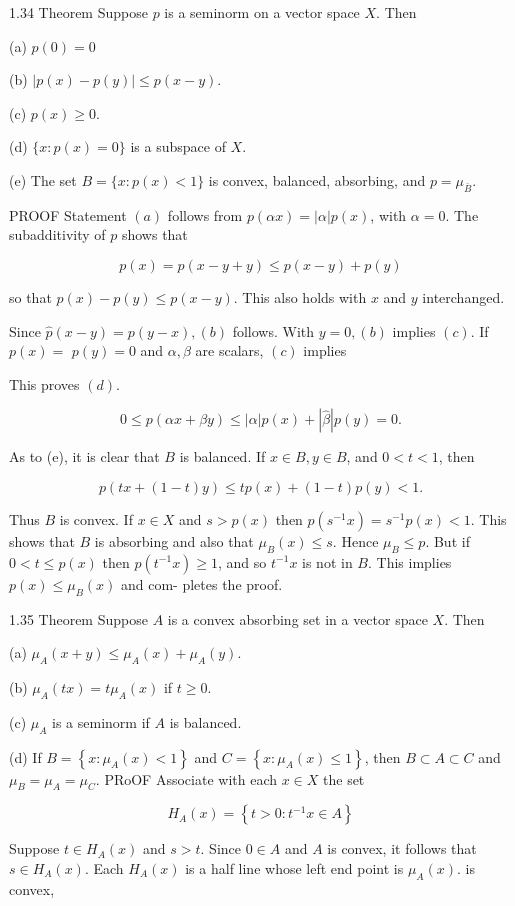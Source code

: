 \documentclass[10pt]{article}
\begin{document}
1.34 Theorem Suppose $p$ is a seminorm on a vector space $X$. Then

(a) $p(0)=0$

(b) $|p(x)-p(y)| \leq p(x-y)$.

(c) $p(x) \geq 0$.

(d) $\{x: p(x)=0\}$ is a subspace of $X$.

(e) The set $B=\{x: p(x)<1\}$ is convex, balanced, absorbing, and $p=\mu_{\bar{B}}$.

PROOF Statement $(a)$ follows from $p(\alpha x)=|\alpha| p(x)$, with $\alpha=0$. The subadditivity of $p$ shows that

$$
p(x)=p(x-y+y) \leq p(x-y)+p(y)
$$

so that $p(x)-p(y) \leq p(x-y)$. This also holds with $x$ and $y$ interchanged.

Since $\hat{p}(x-y)=p(y-x),(b)$ follows. With $y=0,(b)$ implies $(c)$. If $p(x)=$ $p(y)=0$ and $\alpha, \beta$ are scalars, $(c)$ implies

This proves $(d)$.

$$
0 \leq p(\alpha x+\beta y) \leq|\alpha| p(x)+|\hat{\beta}| p(y)=0 .
$$

As to (e), it is clear that $B$ is balanced. If $x \in B, y \in B$, and $0<t<1$, then

$$
p(t x+(1-t) y) \leq t p(x)+(1-t) p(y)<1 .
$$

Thus $B$ is convex. If $x \in X$ and $s>p(x)$ then $p\left(s^{-1} x\right)=s^{-1} p(x)<1$. This shows that $B$ is absorbing and also that $\mu_{B}(x) \leq s$. Hence $\mu_{B} \leq p$. But if $0<t \leq p(x)$ then $p\left(t^{-1} x\right) \geq 1$, and so $t^{-1} x$ is not in $B$. This implies $p(x) \leq \mu_{B}(x)$ and com-
pletes the proof.

1.35 Theorem Suppose $A$ is a convex absorbing set in a vector space $X$. Then

(a) $\mu_{A}(x+y) \leq \mu_{A}(x)+\mu_{A}(y)$.

(b) $\mu_{A}(t x)=t \mu_{A}(x)$ if $t \geq 0$.

(c) $\mu_{A}$ is a seminorm if $A$ is balanced.

(d) If $B=\left\{x: \mu_{A}(x)<1\right\}$ and $C=\left\{x: \mu_{A}(x) \leq 1\right\}$, then $B \subset A \subset C$ and $\mu_{B}=\mu_{A}=\mu_{C}$. PRoOF Associate with each $x \in X$ the set

$$
H_{A}(x)=\left\{t>0: t^{-1} x \in A\right\}
$$

Suppose $t \in H_{A}(x)$ and $s>t$. Since $0 \in A$ and $A$ is convex, it follows that $s \in H_{A}(x)$. Each $H_{A}(x)$ is a half line whose left end point is $\mu_{A}(x)$. is convex,
\end{document}
